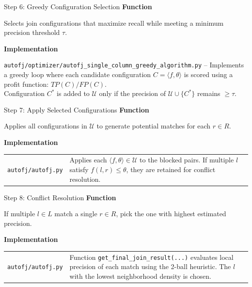 \documentclass[8pt]{beamer} %
\begin{document}
\begin{frame}{Step 6: Greedy Configuration Selection}
	\textbf{Function}
	
	Selects join configurations that maximize recall while meeting a minimum precision threshold $\tau$.
	
	\vspace{2em}
	
	\textbf{Implementation}
	
	\texttt{autofj/optimizer/autofj\_single\_column\_greedy\_algorithm.py} – Implements a greedy loop where each candidate configuration $C = \langle f, \theta \rangle$ is scored using a profit function: $TP(C) / FP(C)$. \\
	Configuration $C^*$ is added to $\mathcal{U}$ only if the precision of $\mathcal{U} \cup \{C^*\}$ remains $\geq \tau$.
\end{frame}

\begin{frame}{Step 7: Apply Selected Configurations}
	\textbf{Function}
	
	Applies all configurations in $\mathcal{U}$ to generate potential matches for each $r \in R$.
	
	\vspace{2em}
	
	\textbf{Implementation}
	
	\begin{tabular}{l p{3in}}
	\texttt{autofj/autofj.py} & Applies each $\langle f, \theta \rangle \in \mathcal{U}$ to the blocked pairs. If multiple $l$ satisfy $f(l, r) \leq \theta$, they are retained for conflict resolution.
	\end{tabular}
	
\end{frame}

\begin{frame}{Step 8: Conflict Resolution}
	\textbf{Function}
	
	If multiple $l \in L$ match a single $r \in R$, pick the one with highest estimated precision.
	
	\vspace{2em}
	
	\textbf{Implementation}

	\begin{tabular}{l p{3in}}	
		\texttt{autofj/autofj.py} & Function \texttt{get\_final\_join\_result(...)} evaluates local precision of each match using the 2-ball heuristic. The $l$ with the lowest neighborhood density is chosen.
	\end{tabular}


\end{frame}
\end{document}
